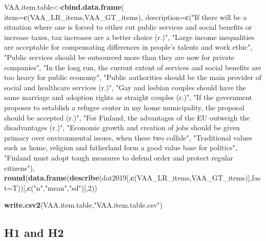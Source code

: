\documentclass[
]{article}
\newenvironment{Shaded}{\begin{snugshade}}{\end{snugshade}}
\newcommand{\DataTypeTok}[1]{\textcolor[rgb]{0.13,0.29,0.53}{#1}}
\newcommand{\DecValTok}[1]{\textcolor[rgb]{0.00,0.00,0.81}{#1}}
\newcommand{\KeywordTok}[1]{\textcolor[rgb]{0.13,0.29,0.53}{\textbf{#1}}}
\newcommand{\NormalTok}[1]{#1}
\newcommand{\StringTok}[1]{\textcolor[rgb]{0.31,0.60,0.02}{#1}}
\begin{document}
\begin{Shaded}
\begin{Highlighting}[]
\NormalTok{VAA.item.table<-}\KeywordTok{cbind.data.frame}\NormalTok{(}
  \DataTypeTok{item=}\KeywordTok{c}\NormalTok{(VAA_LR_items,VAA_GT_items),}
  \DataTypeTok{description=}\KeywordTok{c}\NormalTok{(}\StringTok{"If there will be a situation where one is forced to either cut public services and social benefits or increase taxes, tax increases are a better choice (r.)"}\NormalTok{,}
                \StringTok{"Large income inequalities are acceptable for compensating differences in people's talents and work ethic"}\NormalTok{,}
                \StringTok{"Public services should be outsourced more than they are now for private companies"}\NormalTok{,}
                \StringTok{"In the long run, the current extent of services and social benefits are too heavy for public economy"}\NormalTok{,}
                \StringTok{"Public authorities should be the main provider of social and healthcare services (r.)"}\NormalTok{,}
                \StringTok{"Gay and lesbian couples should have the same marriage and adoption rights as straight couples (r.)"}\NormalTok{,}
                \StringTok{"If the government proposes to establish a refugee center in my home municipality, the proposal should be accepted (r.)"}\NormalTok{,}
                \StringTok{"For Finland, the advantages of the EU outweigh the disadvantages (r.)"}\NormalTok{,}
                \StringTok{"Economic growth and creation of jobs should be given primacy over environmental issues, when these two collide"}\NormalTok{,}
                \StringTok{"Traditional values such as home, religion and fatherland form a good value base for politics"}\NormalTok{,}
                \StringTok{"Finland must adopt tough measures to defend order and protect regular citizens"}\NormalTok{),}
  \KeywordTok{round}\NormalTok{(}\KeywordTok{data.frame}\NormalTok{(}\KeywordTok{describe}\NormalTok{(dat2019[,}\KeywordTok{c}\NormalTok{(VAA_LR_items,VAA_GT_items)],}\DataTypeTok{fast=}\NormalTok{T))[,}\KeywordTok{c}\NormalTok{(}\StringTok{"n"}\NormalTok{,}\StringTok{"mean"}\NormalTok{,}\StringTok{"sd"}\NormalTok{)],}\DecValTok{2}\NormalTok{))}

\KeywordTok{write.csv2}\NormalTok{(VAA.item.table,}\StringTok{"VAA.item.table.csv"}\NormalTok{)}
\end{Highlighting}
\end{Shaded}

\newpage

\hypertarget{h1-and-h2}{%
\subsection{H1 and H2}\label{h1-and-h2}}
\end{document}
